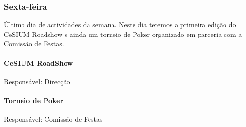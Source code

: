 \subsubsection*{Sexta-feira}
Último dia de actividades da semana. Neste dia teremos a primeira edição do CeSIUM Roadshow e ainda um torneio de Poker organizado em parceria com a Comissão de Festas.

\paragraph{CeSIUM RoadShow}
Responsável: Direcção

\paragraph{Torneio de Poker}
Responsável: Comissão de Festas


